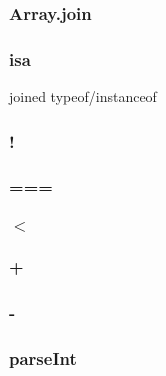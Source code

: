 \subsubsection{Array.join}
\subsubsection{isa}
joined typeof/instanceof
\subsubsection{!}
\subsubsection{===}
\subsubsection{$<$}
\subsubsection{+}
\subsubsection{-}
\subsubsection{parseInt}
